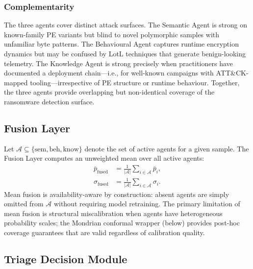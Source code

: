 \documentclass[journal]{IEEEtran}
\newcommand{\sem}{\mathrm{sem}}
\newcommand{\beh}{\mathrm{beh}}
\newcommand{\know}{\mathrm{know}}
\begin{document}
\subsubsection{Complementarity}
The three agents cover distinct attack surfaces.
The Semantic Agent is strong on known-family PE variants but blind to
novel polymorphic samples with unfamiliar byte patterns.
The Behavioural Agent captures runtime encryption dynamics but may be
confused by LotL techniques that generate benign-looking telemetry.
The Knowledge Agent is strong precisely when practitioners have
documented a deployment chain---i.e., for well-known campaigns with
ATT\&CK-mapped tooling---irrespective of PE structure or runtime
behaviour.
Together, the three agents provide overlapping but non-identical
coverage of the ransomware detection surface.

\subsection{Fusion Layer}
\label{subsec:fusion}

Let $\mathcal{A} \subseteq \{\sem, \beh, \know\}$ denote the set of active agents for a
given sample.
The Fusion Layer computes an unweighted mean over all active agents:
\begin{align}
\bar{p}_{\mathrm{fused}} &= \frac{1}{|\mathcal{A}|} \sum_{i \in \mathcal{A}} \bar{p}_i,
\label{eq:fused_prob}\\
\sigma_{\mathrm{fused}} &= \frac{1}{|\mathcal{A}|} \sum_{i \in \mathcal{A}} \sigma_i.
\label{eq:fused_unc}
\end{align}
Mean fusion is availability-aware by construction: absent agents are simply omitted from
$\mathcal{A}$ without requiring model retraining.
The primary limitation of mean fusion is structural miscalibration when agents have
heterogeneous probability scales; the Mondrian conformal wrapper (below) provides
post-hoc coverage guarantees that are valid regardless of calibration quality.

\subsection{Triage Decision Module}
\label{subsec:triage}
\end{document}
